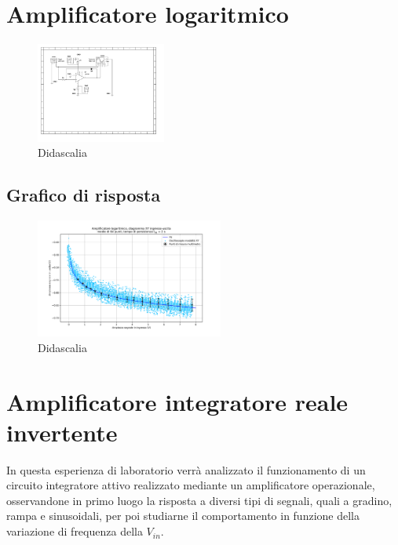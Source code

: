 \documentclass[journal]{IEEEtran}
\begin{document}

\section{Amplificatore logaritmico} %

\begin{figure}[H]%
\begin {center}
\includegraphics[width=0.38\textwidth]{sch-simulations/output/OPA-log.pdf}
\caption{Didascalia}
\label{fig:oscilloscope}
\end {center}
\end{figure}

\subsection{Grafico di risposta}

\begin{figure}[H]%
\begin {center}
\includegraphics[width=0.55\textwidth]{analysis/output/OPA-log-fitted.pdf}
\caption{Didascalia}
\label{fig:OPA-integ-res}
\end {center}
\end{figure}


\section{Amplificatore integratore reale invertente} %
In questa esperienza di laboratorio verrà analizzato il funzionamento di un circuito integratore attivo realizzato mediante un amplificatore operazionale, osservandone in primo luogo la risposta a diversi tipi di segnali, quali a gradino, rampa e sinusoidali, per poi studiarne il comportamento in funzione della variazione di frequenza della $V_{in}$.
\end{document}
